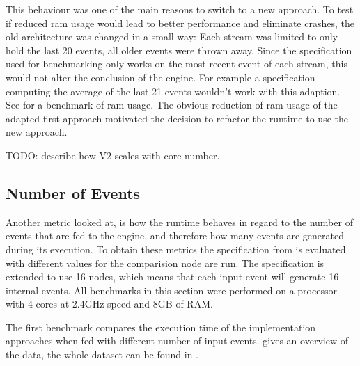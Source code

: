 This behaviour was one of the main reasons to switch to a new approach.
To test if reduced \gls{ram} usage would lead to better performance and eliminate crashes, the old architecture was changed in a small way: Each stream was limited to only hold the last 20 events, all older events were thrown away.
Since the specification used for benchmarking only works on the most recent event of each stream, this would not alter the conclusion of the engine.
For example a specification computing the average of the last 21 events wouldn't work with this adaption.
See  for a benchmark of \gls{ram} usage.
The obvious reduction of \gls{ram} usage of the adapted first approach motivated the decision to refactor the runtime to use the new approach.

TODO: describe how V2 scales with core number.

\subsection{Number of Events}
\label{sec:evaluation:runtime_benchmarks:num_events}

Another metric looked at, is how the runtime behaves in regard to the number of events that are fed to the engine, and therefore how many events are generated during its execution.
To obtain these metrics the specification from  is evaluated with different values for the comparision node are run.
The specification is extended to use 16 nodes, which means that each input event will generate 16 internal events.
All benchmarks in this section were performed on a processor with 4 cores at 2.4GHz speed and 8GB of RAM.

The first benchmark compares the execution time of the implementation approaches when fed with different number of input events.
 gives an overview of the data, the whole dataset can be found in .

